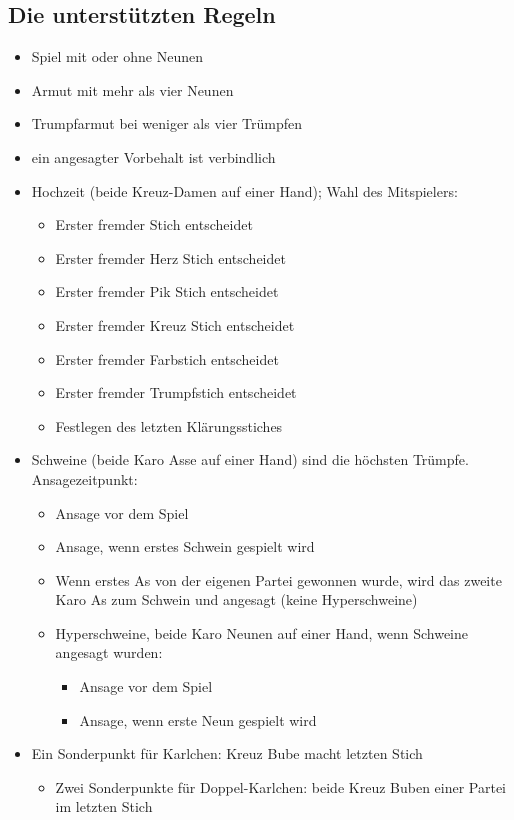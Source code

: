 \documentclass[12pt,a4paper]{article}
\begin{document}
\subsection{Die unterstützten Regeln}
\begin{itemize}
\item Spiel mit oder ohne Neunen
\item Armut mit mehr als vier Neunen
\item Trumpfarmut bei weniger als vier Trümpfen
\item ein angesagter Vorbehalt ist verbindlich
\item Hochzeit (beide Kreuz-Damen auf einer Hand); Wahl des Mitspielers:
\begin{itemize}
\item Erster fremder Stich entscheidet
\item Erster fremder Herz Stich entscheidet
\item Erster fremder Pik Stich entscheidet
\item Erster fremder Kreuz Stich entscheidet
\item Erster fremder Farbstich entscheidet
\item Erster fremder Trumpfstich entscheidet
\item Festlegen des letzten Klärungsstiches
\end{itemize}
\item Schweine (beide Karo Asse auf einer Hand) sind die höchsten Trümpfe. Ansagezeitpunkt:
\begin{itemize}
\item Ansage vor dem Spiel
\item Ansage, wenn erstes Schwein gespielt wird
\item Wenn erstes As von der eigenen Partei gewonnen wurde, wird das zweite Karo As zum Schwein und angesagt
     (keine Hyperschweine)
\item Hyperschweine, beide Karo Neunen auf einer Hand, wenn Schweine angesagt wurden:
\begin{itemize}
\item Ansage vor dem Spiel
\item Ansage, wenn erste Neun gespielt wird
\end{itemize}
\end{itemize}
\item Ein Sonderpunkt für Karlchen: Kreuz Bube macht letzten Stich
\begin{itemize}
\item Zwei Sonderpunkte für Doppel-Karlchen: beide Kreuz Buben einer Partei im letzten Stich

\end{itemize}
\end{itemize}
\end{document}
